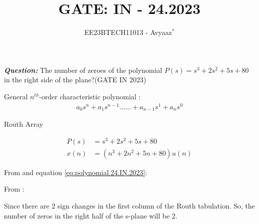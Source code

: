 \documentclass[journal,12pt,twocolumn]{IEEEtran}
\theoremstyle{remark}
\begin{document}

\vspace{3cm}

\title{GATE: IN - 24.2023}
\author{EE23BTECH11013 - Avyaaz$^{*}$%
}
\maketitle
\newpage
\bigskip

\renewcommand{\thefigure}{\arabic{figure}}
\renewcommand{\thetable}{\arabic{table}}

\large\textbf{\textsl{Question:}}
The number of zeroes of the polynomial $P(s) = s^3+2s^2+5s+80$ in the right side of the plane?\hfill(GATE IN 2023) \\
\solution

\noindent General $n^{th}$-order characteristic polynomial : 
\begin{align}
    a_0s^n+a_1s^{n-1}......+a_{n-1}s^1+a_ns^0
\end{align}
\begin{table}[htbp]
\setlength{\extrarowheight}{8pt}
\centering

\caption{Routh Array}
\label{tab:routharray.IN.24.2023}
\end{table}
\begin{align}
  P(s)&= s^3+2s^2+5s+80\label{eq:polynomial.24.IN.2023} \\
  x(n)&=(n^3+2n^2+5n+80)u(n)\label{eq:x(n).IN.24.2023}
\end{align}

\noindent From  and equation \eqref{eq:polynomial.24.IN.2023}:

\begin{table}[htbp]
\setlength{\extrarowheight}{10pt}
\centering

\caption{}
\label{tab:inputs.IN.24.2023}
\end{table}


\noindent From :

Since there are 2 sign changes in the first column of the Routh tabulation. So, the number of zeros in the right
half of the s-plane will be 2.

\end{document}
